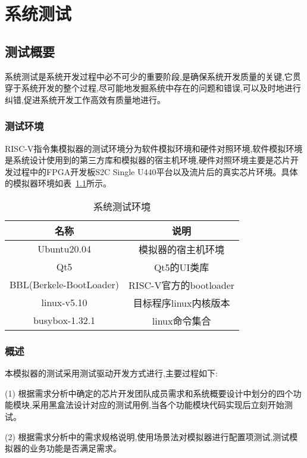 
\chapter{系统测试}

\section{测试概要}
系统测试是系统开发过程中必不可少的重要阶段,是确保系统开发质量的关键,它贯穿于系统开发的整个过程,尽可能地发掘系统中存在的问题和错误,可以及时地进行纠错,促进系统开发工作高效有质量地进行。

\subsection{测试环境}
RISC-V指令集模拟器的测试环境分为软件模拟环境和硬件对照环境,软件模拟环境是系统设计使用到的第三方库和模拟器的宿主机环境,硬件对照环境主要是芯片开发过程中的FPGA开发板S2C Single U440平台以及流片后的真实芯片环境。具体的模拟器环境如表~\ref{tab:env}所示。
\begin{table}[h]
    \centering
    \caption{系统测试环境}
    \label{tab:env}
    \begin{tabular}{cc}
      \toprule
      名称	& 说明\\
      \midrule
    Ubuntu20.04	& \multicolumn{1}{c}{模拟器的宿主机环境}\\
    Qt5	& \multicolumn{1}{c}{Qt5的UI类库}\\
    BBL(Berkele-BootLoader)	& \multicolumn{1}{c}{RISC-V官方的bootloader}\\
    linux-v5.10    & \multicolumn{1}{c}{目标程序linux内核版本}\\
    busybox-1.32.1 & \multicolumn{1}{c}{linux命令集合}\\
      \bottomrule
    \end{tabular}
\end{table}


\subsection{概述}
本模拟器的测试采用测试驱动开发方式进行,主要过程如下:


(1) 根据需求分析中确定的芯片开发团队成员需求和系统概要设计中划分的四个功能模块,采用黑盒法设计对应的测试用例,当各个功能模块代码实现后立刻开始测试。


(2) 根据需求分析中的需求规格说明,使用场景法对模拟器进行配置项测试,测试模拟器的业务功能是否满足需求。


